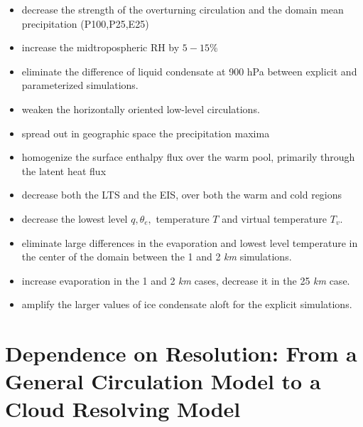 \documentclass[11pt]{article}   	%
\begin{document}
\begin{itemize}
  \item decrease the strength of the overturning circulation and the domain mean precipitation (P100,P25,E25)
  \item increase the midtropospheric RH by $5-15 \% $
  \item eliminate the difference of liquid condensate at 900 hPa between explicit and parameterized simulations.
  \item weaken the horizontally oriented low-level circulations.   
  \item spread out in geographic space the precipitation maxima
  \item homogenize the surface enthalpy flux over the warm pool, primarily through the latent heat flux
  \item decrease both the LTS and the EIS, over both the warm and cold regions
  \item decrease the lowest level $q, \theta_e,$ temperature $T$ and virtual temperature $T_v$.  
  \item eliminate large differences in the evaporation and lowest level temperature in the center of the domain between 
           the 1 and 2 \textit{km} simulations. 
  \item increase evaporation in the 1 and 2 \textit{km} cases, decrease it in the 25 \textit{km} case.
  \item amplify the larger values of ice condensate aloft for the explicit simulations.  
\end{itemize}


\section{Dependence on Resolution: From a General Circulation Model to a Cloud Resolving Model}
\end{document}
